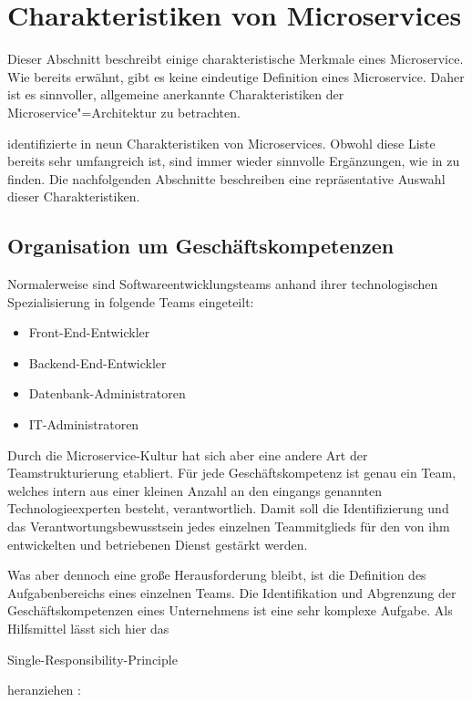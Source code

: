 \section{Charakteristiken von Microservices}

Dieser Abschnitt beschreibt einige charakteristische Merkmale eines Microservice. Wie bereits erwähnt, gibt es keine eindeutige Definition eines Microservice. Daher ist es sinnvoller, allgemeine anerkannte Charakteristiken der Microservice"=Architektur zu betrachten.
 
\citeauthor{FowlerMS} identifizierte in \cite{FowlerMS} neun Charakteristiken von Microservices. Obwohl diese Liste bereits sehr umfangreich ist, sind immer wieder sinnvolle Ergänzungen, wie in \cite[3-9]{HorsdalMS} zu finden. Die nachfolgenden Abschnitte beschreiben eine repräsentative Auswahl dieser Charakteristiken.

\subsection{Organisation um Geschäftskompetenzen}

Normalerweise sind Softwareentwicklungsteams anhand ihrer technologischen Spezialisierung \zB in folgende Teams eingeteilt:

\begin{itemize}
	\item Front-End-Entwickler
	\item Backend-End-Entwickler
	\item Datenbank-Administratoren
	\item IT-Administratoren
\end{itemize}

Durch die Microservice-Kultur hat sich aber eine andere Art der Teamstrukturierung etabliert. Für jede Geschäftskompetenz ist genau ein Team, welches intern aus einer kleinen Anzahl an den eingangs genannten Technologieexperten besteht, verantwortlich. Damit soll die Identifizierung und das Verantwortungsbewusstsein jedes einzelnen Teammitglieds für den von ihm entwickelten und betriebenen Dienst gestärkt werden.

Was aber dennoch eine große Herausforderung bleibt, ist die Definition des Aufgabenbereichs eines einzelnen Teams. Die Identifikation und Abgrenzung der Geschäftskompetenzen eines Unternehmens ist eine sehr komplexe Aufgabe. Als Hilfsmittel lässt sich hier das \begin{english} Single-Responsibility-Principle\end{english} heranziehen \cite[116]{MartinAgile}: 

